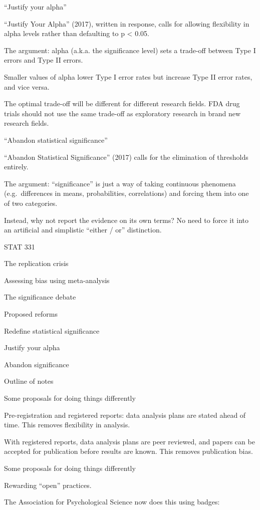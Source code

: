 \documentclass[
  letterpaper,
  DIV=11,
  numbers=noendperiod]{scrreprt}
\begin{document}
``Justify your alpha''

``Justify Your Alpha'' (2017), written in response, calls for allowing
flexibility in alpha levels rather than defaulting to p \textless{}
0.05.

The argument: alpha (a.k.a. the significance level) sets a trade-off
between Type I errors and Type II errors.

Smaller values of alpha lower Type I error rates but increase Type II
error rates, and vice versa.

The optimal trade-off will be different for different research fields.
FDA drug trials should not use the same trade-off as exploratory
research in brand new research fields.

``Abandon statistical significance''

``Abandon Statistical Significance'' (2017) calls for the elimination of
thresholds entirely.

The argument: ``significance'' is just a way of taking continuous
phenomena (e.g.~differences in means, probabilities, correlations) and
forcing them into one of two categories.

Instead, why not report the evidence on its own terms? No need to force
it into an artificial and simplistic ``either / or'' distinction.

STAT 331

The replication crisis

Assessing bias using meta-analysis

The significance debate

Proposed reforms

Redefine statistical significance

Justify your alpha

Abandon significance

Outline of notes

Some proposals for doing things differently

Pre-registration and registered reports: data analysis plans are stated
ahead of time. This removes flexibility in analysis.

With registered reports, data analysis plans are peer reviewed, and
papers can be accepted for publication before results are known. This
removes publication bias.

Some proposals for doing things differently

Rewarding ``open'' practices.

The Association for Psychological Science now does this using badges:
\end{document}
